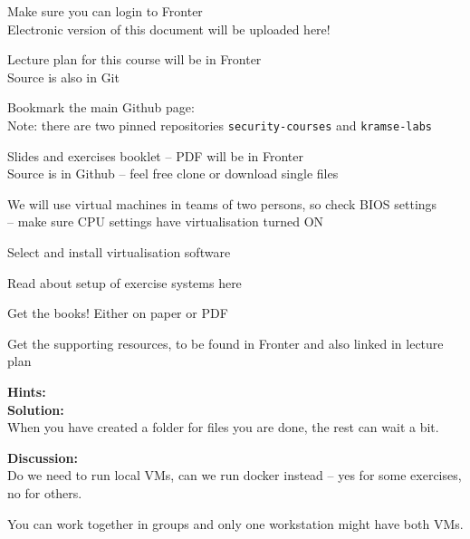 \documentclass[a4paper,11pt,notitlepage]{report}
\begin{document}
\begin{list2}
\item[\faSquareO] Make sure you can login to Fronter \\
Electronic version of this document will be uploaded here!
\item[\faSquareO] Lecture plan for this course will be in Fronter\\
Source is also in Git 
\item[\faSquareO] Bookmark the main Github page: \\
Note: there are two pinned repositories \verb+security-courses+ and \verb+kramse-labs+
\item[\faSquareO] Slides and exercises booklet -- PDF will be in Fronter\\
Source is in Github -- feel free clone or download single files\\
{\footnotesize{}}
\item[\faSquareO] We will use virtual machines in teams of two persons, so check BIOS settings\\
-- make sure CPU settings have virtualisation turned ON
\item[\faSquareO] Select and install virtualisation software
\item[\faSquareO] Read about setup of exercise systems here\\
\item[\faSquareO] Get the books! Either on paper or PDF
\item[\faSquareO] Get the supporting resources, to be found in Fronter and also linked in lecture plan
\end{list2}


{\bf Hints:}\\

{\bf Solution:}\\
When you have created a folder for files you are done, the rest can wait a bit.

{\bf Discussion:}\\
Do we need to run local VMs, can we run docker instead -- yes for some exercises, no for others.

You can work together in groups and only one workstation might have both VMs.
\end{document}
